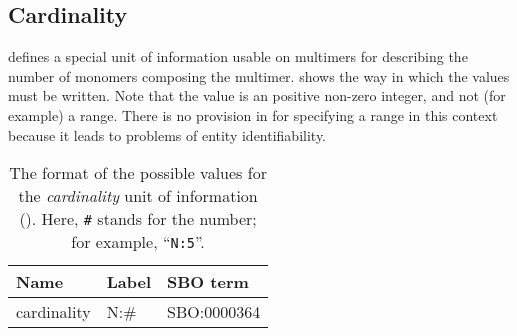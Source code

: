 \subsection{Cardinality}
\label{sec:cardinality-cv}

\SBGNPDLone defines a special unit of information usable on multimers for describing the number of monomers composing the multimer.   shows the way in which the values must be written.  Note that the value is an positive non-zero integer, and not (for example) a range.  There is no provision in \SBGNPDLone for specifying a range in this context because it leads to problems of entity identifiability.

\begin{table}[h]
  \centering
  \begin{tabular}{l>{\ttfamily}l>{\ttfamily}l}
    \toprule
    \textbf{Name}   & \textbf{\rmfamily Label} & \textbf{\rmfamily SBO term} \\
    \midrule
    cardinality    & N:\#  & SBO:0000364\\
    \bottomrule
  \end{tabular}
  \caption{The format of the possible values for the
    \emph{cardinality} unit of information
    ().  Here, \texttt{\#} stands for the
    number; for example, ``\texttt{N:5}''.}
  \label{tab:cardinality-cv}
\end{table}





